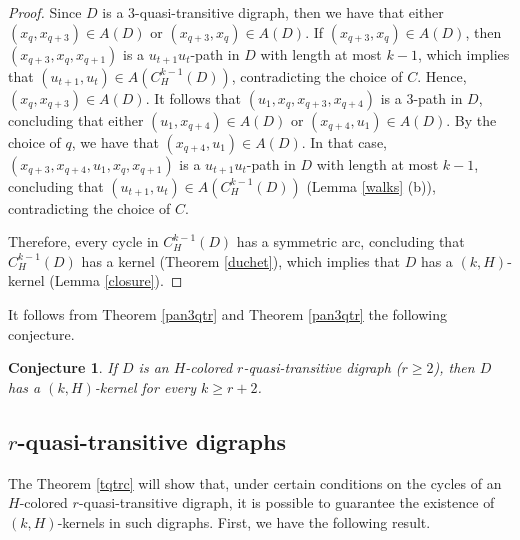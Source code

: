 \documentclass[10pt,a4paper]{article}
\newtheorem{conj}[theorem]{Conjecture}
\begin{document}
\begin{proof}
Since $D$ is a $3$-quasi-transitive digraph, then we have that either $(x_{q}, x_{q+3}) \in A(D)$ or $(x_{q+3}, x_{q}) \in A(D)$. If $(x_{q+3}, x_{q})  \in A(D)$, then $(x_{q+3}, x_{q}, x_{q+1})$ is a $u_{t+1}u_{t}$-path in $D$ with length at most $k-1$, which implies that $(u_{t+1}, u_{t}) \in A(C_{H}^{k-1}(D))$, contradicting the choice of $C$. Hence, $(x_{q}, x_{q+3}) \in A(D)$. It follows that $(u_{1}, x_{q}, x_{q+3}, x_{q+4})$ is a $3$-path in $D$, concluding that either $(u_{1}, x_{q+4}) \in A(D)$ or $(x_{q+4}, u_{1}) \in A(D)$. By the choice of $q$, we have that $(x_{q+4}, u_{1}) \in A(D)$. In that case, $(x_{q+3}, x_{q+4}, u_{1}, x_{q}, x_{q+1})$ is a $u_{t+1}u_{t}$-path in $D$ with length at most $k-1$, concluding that $(u_{t+1}, u_{t}) \in A(C_{H}^{k-1}(D))$ (Lemma \ref{walks} (b)), contradicting the choice of $C$.

Therefore, every cycle in $C_{H}^{k-1}(D)$ has a symmetric arc, concluding that $C_{H}^{k-1}(D)$ has a kernel (Theorem \ref{duchet}), which implies that $D$ has a $(k,H)$-kernel (Lemma \ref{closure}).
\end{proof}

It follows from Theorem \ref{pan3qtr} and Theorem \ref{pan3qtr} the following conjecture.

\begin{conj}
 If $D$ is an $H$-colored $r$-quasi-transitive digraph ($r \geq 2$), then $D$ has a $(k,H)$-kernel for every $k \geq r+2$.
\end{conj}


\subsection{$r$-quasi-transitive digraphs}

The Theorem \ref{tqtrc} will show that, under certain conditions on the cycles of an $H$-colored $r$-quasi-transitive digraph, it is possible to guarantee the existence of $(k,H)$-kernels in such digraphs. First, we have the following result.
\end{document}

